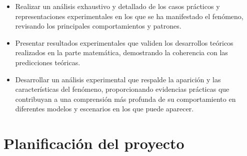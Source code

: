 \begin{itemize}
    \item Realizar un análisis exhaustivo y detallado de los casos prácticos y representaciones experimentales en los que se ha manifestado el fenómeno, revisando los principales comportamientos y patrones.
    \item Presentar resultados experimentales que validen los desarrollos teóricos realizados en la parte matemática, demostrando la coherencia con las predicciones teóricas.
    \item Desarrollar un análisis experimental que respalde la aparición y las características del fenómeno, proporcionando evidencias prácticas que contribuyan a una comprensión más profunda de su comportamiento en diferentes modelos y escenarios en los que puede aparecer.\newline
\end{itemize}

\section{Planificación del proyecto}

\endinput
